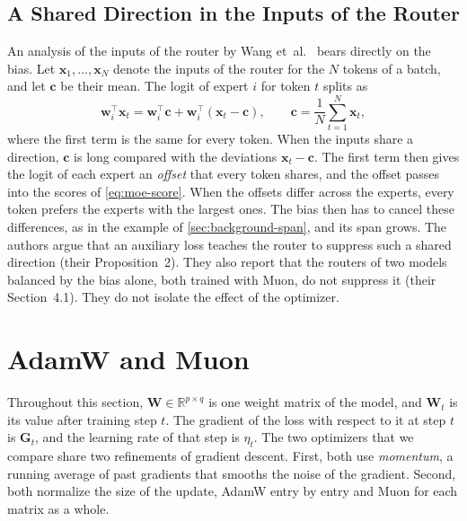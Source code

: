\subsection{A Shared Direction in the Inputs of the Router}
\label{sec:background-offset}
An analysis of the inputs of the router by Wang et~al.~\cite{wang2026myth} bears directly on the bias. Let $\mathbf{x}_1, \dots, \mathbf{x}_N$ denote the inputs of the router for the $N$ tokens of a batch, and let $\mathbf{c}$ be their mean. The logit of expert $i$ for token $t$ splits as
\begin{equation}[eq:background-offset]{}
  \mathbf{w}_i^{\top} \mathbf{x}_t = \mathbf{w}_i^{\top} \mathbf{c} + \mathbf{w}_i^{\top} (\mathbf{x}_t - \mathbf{c}), \qquad \mathbf{c} = \frac{1}{N} \sum_{t=1}^{N} \mathbf{x}_t,
\end{equation}
where the first term is the same for every token. When the inputs share a direction, $\mathbf{c}$ is long compared with the deviations $\mathbf{x}_t - \mathbf{c}$. The first term then gives the logit of each expert an \emph{offset} that every token shares, and the offset passes into the scores of \cref{eq:moe-score}. When the offsets differ across the experts, every token prefers the experts with the largest ones. The bias then has to cancel these differences, as in the example of \cref{sec:background-span}, and its span grows. The authors argue that an auxiliary loss teaches the router to suppress such a shared direction (their Proposition~2). They also report that the routers of two models balanced by the bias alone, both trained with Muon, do not suppress it (their Section~4.1). They do not isolate the effect of the optimizer.

\section{AdamW and Muon}
\label{sec:background-optimizers}
Throughout this section, $\mathbf{W} \in \mathbb{R}^{p \times q}$ is one weight matrix of the model, and $\mathbf{W}_t$ is its value after training step $t$. The gradient of the loss with respect to it at step $t$ is $\mathbf{G}_t$, and the learning rate of that step is $\eta_t$. The two optimizers that we compare share two refinements of gradient descent. First, both use \emph{momentum}, a running average of past gradients that smooths the noise of the gradient. Second, both normalize the size of the update, AdamW entry by entry and Muon for each matrix as a whole.

